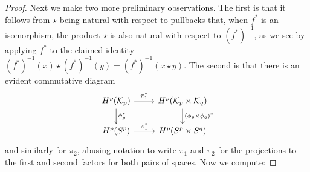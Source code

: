 \begin{proof}
	Next we make two more preliminary observations.
	The first is that it follows from $\star$ being natural with respect to pullbacks that, when $f^*$ is an isomorphism, the product $\star$ is also natural with respect to $(f^*)^{-1}$, as we see by applying $f^*$ to the claimed identity $(f^*)^{-1}(x)\star (f^*)^{-1}(y) = (f^*)^{-1}(x\star y)$.
	The second is that there is an evident commutative diagram
	\begin{equation}\label{D: projections}
		\begin{tikzcd}
			H^p(\mc K_p) \arrow{r}{\pi_1^*} \arrow[d, "\phi_p^*"] &
			H^p(\mc K_p \times \mc K_q) \arrow[d, "(\phi_p \times \phi_q)^*"] \\
			H^p(S^p) \arrow{r}{\pi_1^*} & H^p(S^p \times S^q)
		\end{tikzcd}
	\end{equation}
	and similarly for $\pi_2$, abusing notation to write $\pi_1$ and $\pi_2$ for the projections to the first and second factors for both pairs of spaces.
	Now we compute:
	\begin{comment}
		Now, we consider the diagram
		\begin{diagram}
			H^{p+q}(M)&\lTo^{\diag^*(\bar \alpha \times \bar \beta)^*}& H^{p+q}(\mc K_p \times \mc K_q)&\lTo^{\mu^*}&H^{p+q}(\mc K_{p+q})\\
			&&\dTo^{(\phi_p \times \phi_q)^*}&&\dTo^{\phi_{p+q}}\\
			&&H^{p+q}(S^p \times S^q)&\lTo^{\nu^*}&H^{p+q}(S^{p+q}).
		\end{diagram}
		As the $p+1$ skeleton of $K_p$ can be taken to be the image of $S^p$ under $\phi_p$, it is standard that the vertical maps are isomorphisms.


\end{comment}
\end{proof}
